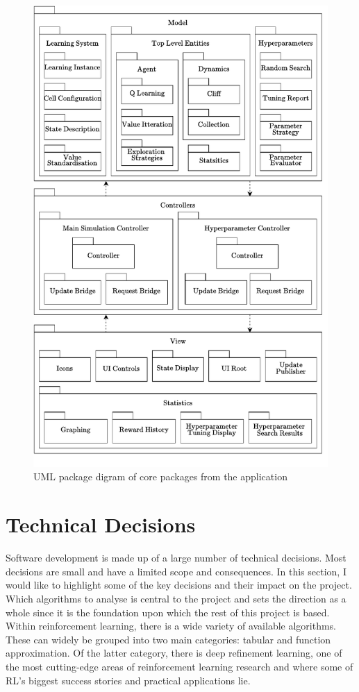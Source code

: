 \documentclass[]{final_report}
\begin{document}
\begin{figure}[H]
  \centering
  
  \includegraphics[width=\textwidth]{package_diagram-2.pdf}
  
  \caption{\label{fig:package-diagram} UML package digram of core packages from the application}
\end{figure}

\section{Technical Decisions}\label{section:technical-decsions}

Software development is made up of a large number of technical decisions. Most decisions are small and have a limited scope and consequences. In this section, I would like to highlight some of the key decisions and their impact on the project. Which algorithms to analyse is central to the project and sets the direction as a whole since it is the foundation upon which the rest of this project is based. Within reinforcement learning, there is a wide variety of available algorithms. These can widely be grouped into two main categories: tabular and function approximation. Of the latter category, there is deep refinement learning, one of the most cutting-edge areas of reinforcement learning research and where some of RL's biggest success stories and practical applications lie. 
\end{document}
